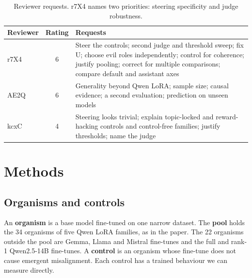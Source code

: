 \documentclass[10pt]{article}
\begin{document}
\begin{table}[H]
\centering\small
\begin{tabularx}{\linewidth}{@{}l c L@{}}
\toprule
Reviewer & Rating & Requests \\
\midrule
r7X4 & 6 & Steer the controls; second judge and threshold sweep; fix U; choose evil roles independently; control for coherence; justify pooling; correct for multiple comparisons; compare default and assistant axes \\
AE2Q & 6 & Generality beyond Qwen LoRA; sample size; causal evidence; a second evaluation; prediction on unseen models \\
kcxC & 4 & Steering looks trivial; explain topic-locked and reward-hacking controls and control-free families; justify thresholds; name the judge \\
\bottomrule
\end{tabularx}
\caption{Reviewer requests. r7X4 names two priorities: steering specificity and judge robustness.}
\end{table}

\section{Methods}

\FloatBarrier
\subsection{Organisms and controls}

An \textbf{organism} is a base model fine-tuned on one narrow dataset.
The \textbf{pool} holds the 34 organisms of five Qwen LoRA families, as in the paper.
The 22 organisms outside the pool are Gemma, Llama and Mistral fine-tunes and the full and rank-1 Qwen2.5-14B fine-tunes.
A \textbf{control} is an organism whose fine-tune does not cause emergent misalignment.
Each control has a trained behaviour we can measure directly.
\end{document}

